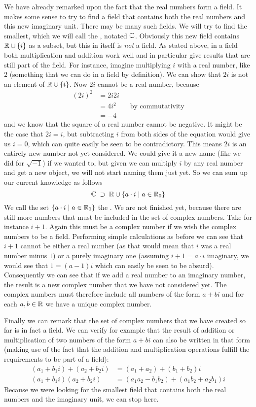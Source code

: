 We have already remarked upon the fact that the real numbers form a field. It makes some sense to try to find a field that contains both the real numbers and this new imaginary unit. There may be many such fields. We will try to find the smallest, which we will call the , notated $\mathbb{C}$. Obviously this new field contains $\mathbb{R} \cup \{i\}$ as a subset, but this in itself is \emph{not} a field. As stated above, in a field both multiplication and addition work well and in particular give results that are still part of the field.  For instance, imagine multiplying $i$ with a real number, like $2$ (something that we can do in a field by definition). We can show that $2i$ is not an element of $\mathbb{R} \cup \{i\}$. Now $2i$ cannot be a real number, because
\begin{align*}
(2i)^2 &= 2i2i \\
&= 4i^2 \qquad \text{by commutativity} \\
&= -4
\end{align*}
and we know that the square of a real number cannot be negative. It might be the case that $2i = i$, but subtracting $i$ from both sides of the equation would give us $i=0$, which can quite easily be seen to be contradictory. This means $2i$ is an entirely new number not yet considered. We could give it a new name (like we did for $\sqrt{-1}$) if we wanted to, but given we can multiply $i$ by any real number and get a new object, we will not start naming them just yet. So we can sum up our current knowledge as follows
\[ \mathbb{C} \; \supset \; \mathbb{R} \cup \{a\cdot i \; | \; a \in \mathbb{R}_0\} \]
We call the set $\{a\cdot i \; | \; a \in \mathbb{R}_0\}$ the . We are not finished yet, because there are still more numbers that must be included in the set of complex numbers. Take for instance $i + 1$. Again this must be a complex number if we wish the complex numbers to be a field. Performing simple calculations as before we can see that $i + 1$ cannot be either a real number (as that would mean that $i$ was a real number minus $1$) or a purely imaginary one (assuming $i + 1 = a\cdot i$ imaginary, we would see that $1 = (a-1)i$ which can easily be seen to be absurd). Consequently we can see that if we add a real number to an imaginary number, the result is a new complex number that we have not considered yet. The complex numbers must therefore include all numbers of the form $a + bi$ and for each $a,b \in \mathbb{R}$ we have a unique complex number.

Finally we can remark that the set of complex numbers that we have created so far is in fact a field. We can verify for example that the result of addition or multiplication of two numbers of the form $a+bi$ can also be written in that form (making use of the fact that the addition and multiplication operations fulfill the requirements to be part of a field):
\begin{align*}
(a_1 + b_1i) + (a_2 + b_2i) &= (a_1 + a_2) + (b_1 + b_2)i \\
(a_1 + b_1i)(a_2 + b_2i) &= (a_1a_2 - b_1b_2) + (a_1b_2 + a_2b_1)i
\end{align*}
Because we were looking for the smallest field that contains both the real numbers and the imaginary unit, we can stop here.


